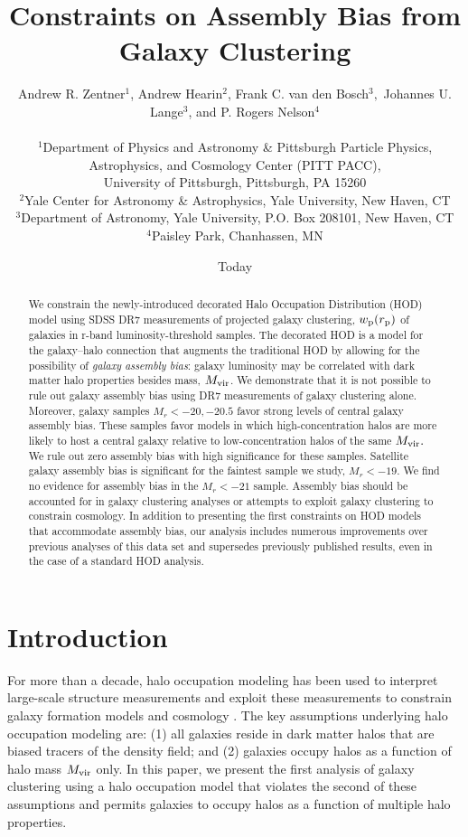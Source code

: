 \documentclass[usenatbib,usegraphicx,letterpaper]{mn2e}
\title[Clustering Constraints on Assembly Bias]
{
Constraints on Assembly Bias from Galaxy Clustering
}
\author[Zentner et al.]
{Andrew R. Zentner$^{1}$, Andrew Hearin$^{2}$, Frank C. van den Bosch$^{3},$ \newauthor
Johannes U. Lange$^{3}$, and P. Rogers Nelson$^{4}$\\ \\
$^1$Department of Physics and Astronomy \& Pittsburgh Particle Physics, Astrophysics, and Cosmology Center (PITT PACC),\\ University of Pittsburgh, Pittsburgh, PA 15260\\
$^2$Yale Center for Astronomy \& Astrophysics, Yale University, New Haven, CT\\
$^3$Department of Astronomy, Yale University, P.O. Box 208101, New Haven, CT\\
$^4$Paisley Park, Chanhassen, MN\\
}
\date{Today}
\newcommand{\mvir}{M_{\rm vir}}
\newcommand{\wprp}{w_{\mathrm{p}}}
\newcommand{\magr}{M_r}
\begin{document}
\maketitle
\begin{abstract}
  We constrain the newly-introduced decorated Halo Occupation Distribution (HOD) 
  model using SDSS DR7 measurements of projected galaxy clustering, $\wprp (r_{\rm p})$ 
  of galaxies in r-band luminosity-threshold samples. 
  The decorated HOD is a model for the galaxy--halo
  connection that augments the traditional HOD by allowing for the possibility of 
  {\em galaxy assembly bias}: galaxy luminosity may be correlated with dark matter halo
  properties besides mass, $\mvir$. We demonstrate that it
  is not possible to rule out galaxy assembly bias using DR7 measurements of galaxy 
  clustering alone. Moreover, galaxy samples $\magr<-20, -20.5$
  favor strong levels of central galaxy assembly bias. These samples favor models 
  in which high-concentration halos are more likely to host a central galaxy
  relative to low-concentration halos of the same $\mvir.$ We rule out
  zero assembly bias with high significance for these
  samples. Satellite galaxy assembly bias is significant for the
  faintest sample we study, $\magr<-19.$ We find no evidence for
  assembly bias in the $\magr<-21$ sample. Assembly bias should be accounted for 
  in galaxy clustering analyses or attempts to exploit galaxy clustering to constrain cosmology. 
  In addition to presenting the first constraints on HOD models that accommodate assembly bias, our analysis 
  includes numerous improvements over previous analyses of this data set and 
  supersedes previously published results, even in the case of a standard HOD analysis.
\end{abstract}

\section{Introduction}
\label{section:introduction}

For more than a decade, halo occupation modeling has been used to
interpret large-scale structure measurements and exploit these
measurements to constrain galaxy formation models and cosmology
\citep[e.g.,][]{yang03,tinker05,zehavi05a,
  porciani06,vdBosch07,Zheng07,conroy_wechsler09,yang09b,zehavi_etal11,guo_etal11b,
  wake_etal11,yang11a,yang12,leauthaud_etal12,rod_puebla12,tinker_etal13,cacciato_etal13,
  more_etal13,guo_etal14,zu_mandelbaum15b}. The key assumptions
underlying halo occupation modeling are: (1) all galaxies reside in
dark matter halos that are biased tracers of the density field; and
(2) galaxies occupy halos as a function of halo mass $\mvir$ only. 
In this paper, we present the first analysis of galaxy clustering using 
a halo occupation model that violates the second of these assumptions 
and permits galaxies to occupy halos as a function of multiple halo properties.
\end{document}
